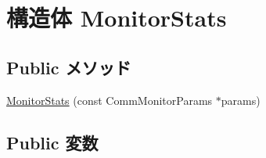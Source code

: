 \hypertarget{structCommMonitor_1_1MonitorStats}{
\section{構造体 MonitorStats}
\label{structCommMonitor_1_1MonitorStats}
}
\subsection*{Public メソッド}
\begin{DoxyCompactItemize}
\item 
\hyperlink{structCommMonitor_1_1MonitorStats_a6e93f7a5c6eb0e765d7a1a51fca229d8}{MonitorStats} (const CommMonitorParams $\ast$params)
\end{DoxyCompactItemize}
\subsection*{Public 変数}
